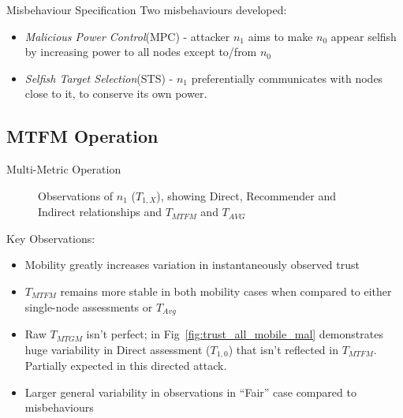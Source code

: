 \documentclass{beamer}
\begin{document}
\begin{frame}{Misbehaviour Specification}
  Two misbehaviours developed:
  \begin{itemize}
    \item \emph{Malicious Power Control}(MPC) - attacker $n_1$ aims to make $n_0$ appear selfish by increasing power to all nodes except to/from $n_0$
    \item \emph{Selfish Target Selection}(STS) - $n_1$ preferentially communicates with nodes close to it, to conserve its own power.
  \end{itemize}

\end{frame}

\subsection{MTFM Operation}

\begin{frame}[allowframebreaks]{Multi-Metric Operation}
  \setcounter{subfigure}{0}%
  \begin{figure}[htp]
    \centering
    \hfil
    \hfil
    \hfil

    \hfil
    \hfil
    \hfil
    \caption{Observations of $n_1$ ($T_{1,X}$), showing Direct, Recommender and Indirect relationships and $T_{MTFM}$ and $T_{AVG}$\hyperlink{fig:trust_mobility_closeup}{}}
    \label{fig:trust_mobility}
  \end{figure}
\framebreak
Key Observations: 
  \begin{itemize}
    \item Mobility greatly increases variation in instantaneously observed trust
    \item $T_{MTFM}$ remains more stable in both mobility cases when compared to either single-node assessments or $T_{Avg}$
    \item Raw $T_{MTGM}$ isn't perfect; in Fig~\ref{fig:trust_all_mobile_mal} demonstrates huge variability in Direct assessment ($T_{1,0}$) that isn't reflected in $T_{MTFM}$. Partially expected in this directed attack.
    \item Larger general variability in observations in ``Fair'' case compared to misbehaviours
  \end{itemize}
\end{frame}
\end{document}
